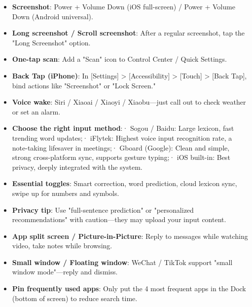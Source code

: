 \begin{itemize}
  \item \textbf{Screenshot}: Power + Volume Down (iOS full-screen) / Power + Volume Down (Android universal).
  \item \textbf{Long screenshot / Scroll screenshot}: After a regular screenshot, tap the "Long Screenshot" option.
  \item \textbf{One-tap scan}: Add a "Scan" icon to Control Center / Quick Settings.
  \item \textbf{Back Tap (iPhone)}: In [Settings] > [Accessibility] > [Touch] > [Back Tap], bind actions like "Screenshot" or "Lock Screen."
  \item \textbf{Voice wake}: Siri / Xiaoai / Xiaoyi / Xiaobu—just call out to check weather or set an alarm.
\end{itemize}


\begin{itemize}
  \item \textbf{Choose the right input method}:\newline · Sogou / Baidu: Large lexicon, fast trending word updates;\newline · iFlytek: Highest voice input recognition rate, a note-taking lifesaver in meetings;\newline · Gboard (Google): Clean and simple, strong cross-platform sync, supports gesture typing;\newline · iOS built-in: Best privacy, deeply integrated with the system.
  \item \textbf{Essential toggles}: Smart correction, word prediction, cloud lexicon sync, swipe up for numbers and symbols.
  \item \textbf{Privacy tip}: Use "full-sentence prediction" or "personalized recommendations" with caution—they may upload your input content.
\end{itemize}


\begin{itemize}
  \item \textbf{App split screen / Picture-in-Picture}: Reply to messages while watching video, take notes while browsing.
  \item \textbf{Small window / Floating window}: WeChat / TikTok support "small window mode"—reply and dismiss.
  \item \textbf{Pin frequently used apps}: Only put the 4 most frequent apps in the Dock (bottom of screen) to reduce search time.
\end{itemize}

